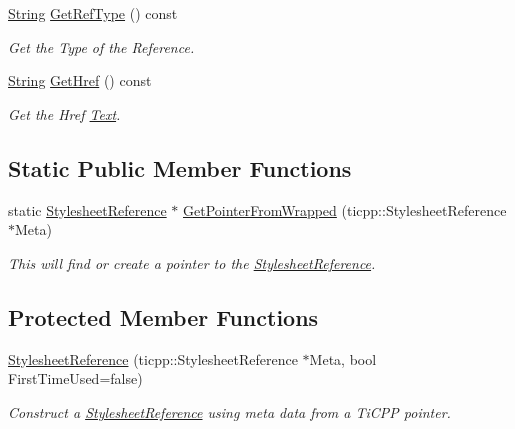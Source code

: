 \begin{DoxyCompactItemize}
\hyperlink{namespacephys_aa03900411993de7fbfec4789bc1d392e}{String} \hyperlink{classphys_1_1xml_1_1StylesheetReference_ace85c372de817aa4077e6aa0c8998914}{GetRefType} () const 
\begin{DoxyCompactList}\small\item\em Get the Type of the Reference. \item\end{DoxyCompactList}\item 
\hyperlink{namespacephys_aa03900411993de7fbfec4789bc1d392e}{String} \hyperlink{classphys_1_1xml_1_1StylesheetReference_a325ae93ec2132b83f951a723cb2a4e18}{GetHref} () const 
\begin{DoxyCompactList}\small\item\em Get the Href \hyperlink{classphys_1_1xml_1_1Text}{Text}. \item\end{DoxyCompactList}\end{DoxyCompactItemize}
\subsection*{Static Public Member Functions}
\begin{DoxyCompactItemize}
\item 
static \hyperlink{classphys_1_1xml_1_1StylesheetReference}{StylesheetReference} $\ast$ \hyperlink{classphys_1_1xml_1_1StylesheetReference_a48c3822346c9f827f089fbd65d91200d}{GetPointerFromWrapped} (ticpp::StylesheetReference $\ast$Meta)
\begin{DoxyCompactList}\small\item\em This will find or create a pointer to the \hyperlink{classphys_1_1xml_1_1StylesheetReference}{StylesheetReference}. \item\end{DoxyCompactList}\end{DoxyCompactItemize}
\subsection*{Protected Member Functions}
\begin{DoxyCompactItemize}
\item 
\hyperlink{classphys_1_1xml_1_1StylesheetReference_af6382771debf4048ea5ab77d9c091b07}{StylesheetReference} (ticpp::StylesheetReference $\ast$Meta, bool FirstTimeUsed=false)
\begin{DoxyCompactList}\small\item\em Construct a \hyperlink{classphys_1_1xml_1_1StylesheetReference}{StylesheetReference} using meta data from a TiCPP pointer. \item\end{DoxyCompactList}\end{DoxyCompactItemize}



